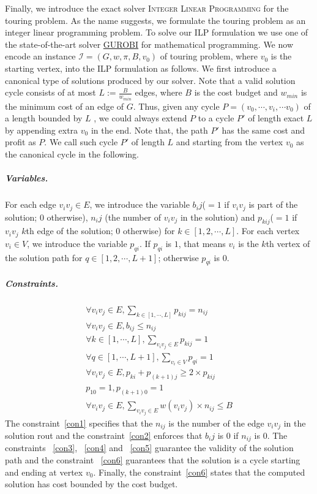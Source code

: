 \documentclass[sigconf,natbib=false]{acmart}
\newcommand{\ilp}{\textsc{Integer Linear Programming}\xspace}
\newcommand{\III}{\mathcal{I}}
\begin{document}
Finally, we introduce the exact solver \ilp for  the touring problem. As the name suggests, we formulate the touring problem as an integer linear programming problem. 	
To solve our ILP formulation we use one of the state-of-the-art solver  \href{https://www.gurobi.com/}{GUROBI} for mathematical programming. 
We now encode an instance $\III = (G, w, \pi, B, v_0)$ of touring problem, where $v_0$ is the starting vertex, into the ILP formulation as follows.
We first introduce a canonical type of solutions produced by our solver.
Note that a valid solution cycle consists of at most $L :=\frac{B}{w_{min}}$ edges, where $B$ is the cost budget and $w_{min}$ is the minimum cost of an edge of $G$.
Thus, given any cycle $P = (v_0, \cdots, v_i, \cdots v_0)$ of a length bounded by $L$ , we could always extend $P$ to a cycle $P'$ of length exact $L$ by appending extra $v_0$ in the end. 
Note that, the path $P'$ has the same cost and profit as $P$. 
We call such cycle  $P'$ of length $L$ and starting from the vertex $v_0$ as the canonical cycle in the following. 
\subparagraph*{\textbf{Variables.}}
For each edge $v_iv_j \in E$, we introduce the variable $b_ij$($= 1$ if $v_iv_j$ is part of the solution; $0$ otherwise), $n_ij$ (the number of $v_iv_j$ in the solution) and $p_{kij}$($= 1$ if $v_iv_j$ $k$th edge of the solution; $0$ otherwise) for $k\in [1, 2, \cdots, L]$. 
For each vertex $v_i \in V$, we introduce the variable $p_{qi}$. 
If $p_{qi}$ is $1$, that means $v_i$ is the $k$th vertex of the solution path for $q\in [1, 2, \cdots, L+1]$; otherwise $p_{qi}$ is $0$.
\subparagraph*{\textbf{Constraints.}} %
\begin{align}
    \forall v_iv_j\in E, \sum_{k \in [1, \cdots, L]}p_{kij} = n_{ij}\label{con1}\\
    \forall v_iv_j\in E, b_{ij} \leq n_{ij}\label{con2}\\
    \forall k \in [1, \cdots, L], \sum_{v_iv_j\in E}p_{kij} = 1\label{con3}\\
    \forall q \in [1, \cdots, L+1], \sum_{v_i\in V}p_{qi} = 1\label{con4}\\
    \forall v_iv_j\in E, p_{ki} + p_{(k+1)j} \geq 2 \times p_{kij}\label{con5}\\
    p_{10} = 1,  p_{(k+1)0} = 1\label{con6}\\
    \forall v_iv_j\in E, \sum_{v_iv_j\in E} w(v_iv_j) \times n_{ij} \leq B\label{con7}
\end{align}
The constraint~\eqref{con1} specifies that the $n_{ij}$ is the number of the edge $v_iv_j$ in the solution rout and the constraint~\eqref{con2} enforces that $b_ij$ is $0$ if $n_{ij}$ is $0$.
The constraints ~\eqref{con3}, ~\eqref{con4} and  ~\eqref{con5} guarantee the validity of the solution path and the constraint  ~\eqref{con6} guarantees that the solution is a cycle starting and ending at vertex $v_0$.
Finally, the constraint~\eqref{con6} states that the computed solution has cost bounded by the cost budget. 
\end{document}
